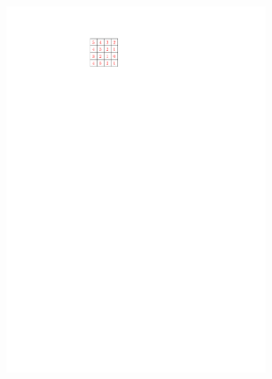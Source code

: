 \documentclass[letterpaper]{article}
\theoremstyle{definition}
\begin{document}
\begin{figure}[t]
\begin{subfigure}[b]{0.12\textwidth}
	\includegraphics[width=0.95\textwidth]{Figs/example1_a1_h.pdf}
    \caption{}
  \end{subfigure}
  \begin{subfigure}[b]{0.12\textwidth}

\end{subfigure}
\end{figure}
\end{document}
